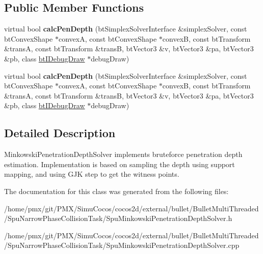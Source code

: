 \subsection*{Public Member Functions}
\begin{DoxyCompactItemize}
\item 
\mbox{\label{classSpuMinkowskiPenetrationDepthSolver_a71196cd3482807329424a71e57c1cffa}} 
virtual bool {\bfseries calc\+Pen\+Depth} (bt\+Simplex\+Solver\+Interface \&simplex\+Solver, const bt\+Convex\+Shape $\ast$convexA, const bt\+Convex\+Shape $\ast$convexB, const bt\+Transform \&transA, const bt\+Transform \&transB, bt\+Vector3 \&v, bt\+Vector3 \&pa, bt\+Vector3 \&pb, class \hyperlink{classbtIDebugDraw}{bt\+I\+Debug\+Draw} $\ast$debug\+Draw)
\item 
\mbox{\label{classSpuMinkowskiPenetrationDepthSolver_a691266ce650c929ef5119fc7e3eed201}} 
virtual bool {\bfseries calc\+Pen\+Depth} (bt\+Simplex\+Solver\+Interface \&simplex\+Solver, const bt\+Convex\+Shape $\ast$convexA, const bt\+Convex\+Shape $\ast$convexB, const bt\+Transform \&transA, const bt\+Transform \&transB, bt\+Vector3 \&v, bt\+Vector3 \&pa, bt\+Vector3 \&pb, class \hyperlink{classbtIDebugDraw}{bt\+I\+Debug\+Draw} $\ast$debug\+Draw)
\end{DoxyCompactItemize}


\subsection{Detailed Description}
Minkowski\+Penetration\+Depth\+Solver implements bruteforce penetration depth estimation. Implementation is based on sampling the depth using support mapping, and using G\+JK step to get the witness points. 

The documentation for this class was generated from the following files\+:\begin{DoxyCompactItemize}
\item 
/home/pmx/git/\+P\+M\+X/\+Simu\+Cocos/cocos2d/external/bullet/\+Bullet\+Multi\+Threaded/\+Spu\+Narrow\+Phase\+Collision\+Task/Spu\+Minkowski\+Penetration\+Depth\+Solver.\+h\item 
/home/pmx/git/\+P\+M\+X/\+Simu\+Cocos/cocos2d/external/bullet/\+Bullet\+Multi\+Threaded/\+Spu\+Narrow\+Phase\+Collision\+Task/Spu\+Minkowski\+Penetration\+Depth\+Solver.\+cpp\end{DoxyCompactItemize}
